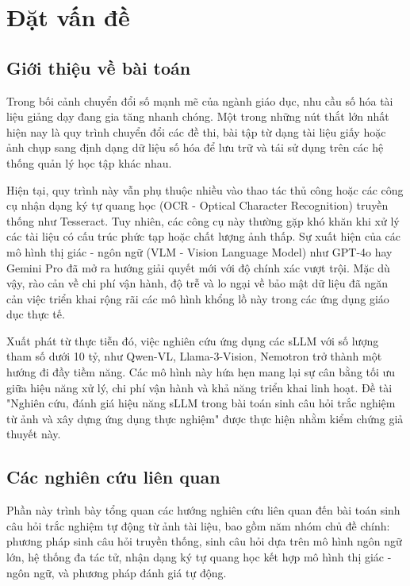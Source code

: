 \chapter{Đặt vấn đề}
\label{chap:dat-van-de}

\section{Giới thiệu về bài toán}

Trong bối cảnh chuyển đổi số mạnh mẽ của ngành giáo dục, nhu cầu số hóa tài liệu
giảng dạy đang gia tăng nhanh chóng. Một trong những nút thắt lớn nhất hiện nay là quy
trình chuyển đổi các đề thi, bài tập từ dạng tài liệu giấy hoặc ảnh chụp sang
định dạng dữ liệu số hóa để lưu trữ và tái sử dụng trên các hệ thống quản lý học
tập khác nhau.

Hiện tại, quy trình này vẫn phụ thuộc nhiều vào thao tác thủ công hoặc các công cụ
nhận dạng ký tự quang học (OCR - Optical Character Recognition) truyền thống như
Tesseract\cite{smith2007overview}. Tuy nhiên, các công cụ này thường gặp khó khăn
khi xử lý các tài liệu có cấu trúc phức tạp hoặc chất lượng ảnh thấp. Sự xuất
hiện của các mô hình thị giác - ngôn ngữ (VLM - Vision Language Model)  như GPT-4o hay Gemini Pro đã mở
ra hướng giải quyết mới với độ chính xác vượt trội. Mặc dù vậy, rào cản về chi
phí vận hành, độ trễ và lo ngại về bảo mật dữ liệu đã ngăn cản việc triển khai rộng
rãi các mô hình khổng lồ này trong các ứng dụng giáo dục thực tế.

Xuất phát từ thực tiễn đó, việc nghiên cứu ứng dụng các sLLM với số lượng tham số dưới 10 tỷ, như Qwen-VL,
Llama-3-Vision, Nemotron trở thành một hướng đi đầy tiềm năng. Các mô hình này hứa
hẹn mang lại sự cân bằng tối ưu giữa hiệu năng xử lý, chi phí vận hành và khả
năng triển khai linh hoạt. Đề tài "Nghiên cứu, đánh giá hiệu năng sLLM trong bài
toán sinh câu hỏi trắc nghiệm từ ảnh và xây dựng ứng dụng thực nghiệm" được thực
hiện nhằm kiểm chứng giả thuyết này.

\section{Các nghiên cứu liên quan}


Phần này trình bày tổng quan các hướng nghiên cứu liên quan đến bài toán sinh câu hỏi trắc nghiệm tự động từ ảnh tài liệu, bao gồm năm nhóm chủ đề chính: phương pháp sinh câu hỏi truyền thống, sinh câu hỏi dựa trên mô hình ngôn ngữ lớn, hệ thống đa tác tử, nhận dạng ký tự quang học kết hợp mô hình thị giác - ngôn ngữ, và phương pháp đánh giá tự động.

